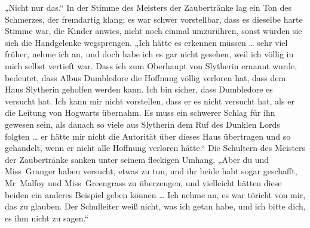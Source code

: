 „Nicht nur das.“
In der Stimme des Meisters der Zaubertränke lag ein Ton des Schmerzes, der fremdartig klang; es war schwer vorstellbar, dass es dieselbe harte Stimme war, die Kinder anwies, nicht noch einmal umzurühren, sonst würden sie sich die Handgelenke wegsprengen.
„Ich hätte es erkennen müssen … sehr viel früher, nehme ich an, und doch habe ich es gar nicht gesehen, weil ich völlig in mich selbst vertieft war. Dass ich zum Oberhaupt von Slytherin ernannt wurde, bedeutet, dass Albus Dumbledore die Hoffnung völlig verloren hat, dass dem Haus Slytherin geholfen werden kann. Ich bin sicher, dass Dumbledore es versucht hat. Ich kann mir nicht vorstellen, dass er es nicht versucht hat, als er die Leitung von Hogwarts übernahm. Es muss ein schwerer Schlag für ihn gewesen sein, als danach so viele aus Slytherin dem Ruf des Dunklen Lords folgten … er hätte mir nicht die Autorität über dieses Haus übertragen und so gehandelt, wenn er nicht alle Hoffnung verloren hätte.“
Die Schultern des Meisters der Zaubertränke sanken unter seinem fleckigen Umhang.
„Aber du und Miss~Granger haben versucht, etwas zu tun, und ihr beide habt sogar geschafft, Mr~Malfoy und Miss~Greengrass zu überzeugen, und vielleicht hätten diese beiden ein anderes Beispiel geben können … Ich nehme an, es war töricht von mir, das zu glauben. Der Schulleiter weiß nicht, was ich getan habe, und ich bitte dich, es ihm nicht zu sagen.“

